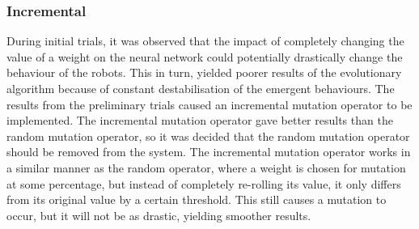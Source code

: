 \subsubsection{Incremental}
During initial trials, it was observed that the impact of completely changing the value of a weight on the neural network could potentially drastically change the behaviour of the robots.
This in turn, yielded poorer results of the evolutionary algorithm because of constant destabilisation of the emergent behaviours.
The results from the preliminary trials caused an incremental mutation operator to be implemented.
The incremental mutation operator gave better results than the random mutation operator, so it was decided that the random mutation operator should be removed from the system. 
The incremental mutation operator works in a similar manner as the random operator, where a weight is chosen for mutation at some percentage, but instead of completely re-rolling its value, it only differs from its original value by a certain threshold.
This still causes a mutation to occur, but it will not be as drastic, yielding smoother results. 

